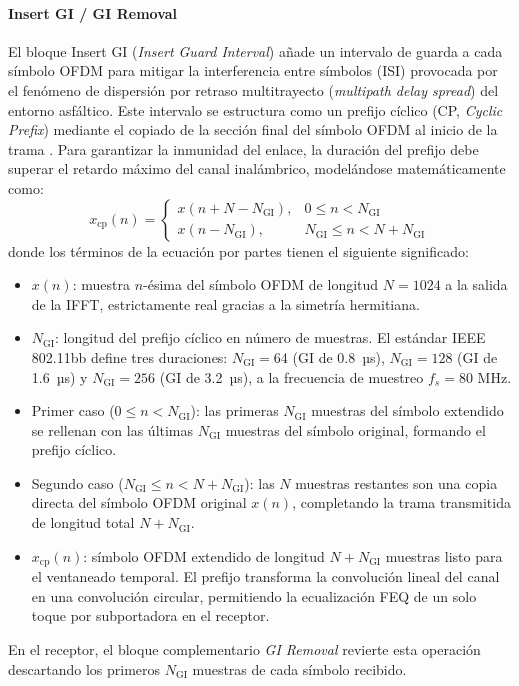 \paragraph{Insert GI / GI Removal}
El bloque Insert GI (\textit{Insert Guard Interval}) añade un intervalo de guarda a cada símbolo OFDM para mitigar la interferencia entre símbolos (ISI) provocada por el fenómeno de dispersión por retraso multitrayecto (\textit{multipath delay spread}) del entorno asfáltico. Este intervalo se estructura como un prefijo cíclico (CP, \textit{Cyclic Prefix}) mediante el copiado de la sección final del símbolo OFDM al inicio de la trama \cite{solaija2023light}. Para garantizar la inmunidad del enlace, la duración del prefijo debe superar el retardo máximo del canal inalámbrico, modelándose matemáticamente \cite{ghassemlooy2019optical} como:
\begin{equation}
	x_{\text{cp}}(n) = \begin{cases}
		x(n + N - N_{\text{GI}}), & 0 \le n < N_{\text{GI}} \\
		x(n - N_{\text{GI}}), & N_{\text{GI}} \le n < N + N_{\text{GI}}
	\end{cases}
	\label{eq:cp_insert}
\end{equation}
donde los términos de la ecuación por partes tienen el siguiente significado:
\begin{itemize}
\item $x(n)$: muestra $n$-ésima del símbolo OFDM de longitud $N = 1024$ a la salida de la IFFT, estrictamente real gracias a la simetría hermitiana.
\item $N_{\text{GI}}$: longitud del prefijo cíclico en número de muestras. El estándar IEEE 802.11bb define tres duraciones: $N_{\text{GI}} = 64$ (GI de 0.8~µs), $N_{\text{GI}} = 128$ (GI de 1.6~µs) y $N_{\text{GI}} = 256$ (GI de 3.2~µs), a la frecuencia de muestreo $f_s = 80\text{ MHz}$.
\item Primer caso ($0 \le n < N_{\text{GI}}$): las primeras $N_{\text{GI}}$ muestras del símbolo extendido se rellenan con las últimas $N_{\text{GI}}$ muestras del símbolo original, formando el prefijo cíclico.
\item Segundo caso ($N_{\text{GI}} \le n < N + N_{\text{GI}}$): las $N$ muestras restantes son una copia directa del símbolo OFDM original $x(n)$, completando la trama transmitida de longitud total $N + N_{\text{GI}}$.
\item $x_{\text{cp}}(n)$: símbolo OFDM extendido de longitud $N + N_{\text{GI}}$ muestras listo para el ventaneado temporal. El prefijo transforma la convolución lineal del canal en una convolución circular, permitiendo la ecualización FEQ de un solo toque por subportadora en el receptor.
\end{itemize}
En el receptor, el bloque complementario \textit{GI Removal} revierte esta operación descartando los primeros $N_{\text{GI}}$ muestras de cada símbolo recibido.

